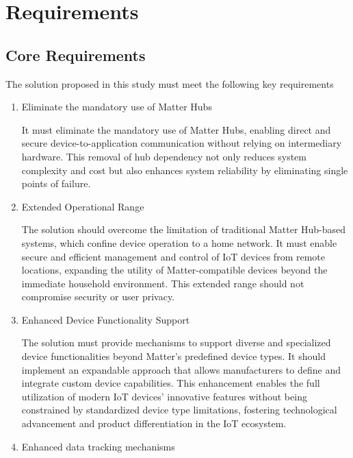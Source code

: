 \documentclass[conference]{IEEEtran}
\begin{document}
\section{Requirements}

\subsection{Core Requirements}
The solution proposed in this study must meet the following key requirements

\begin{enumerate}[itemsep=2ex, parsep=1ex]
	\item Eliminate the mandatory use of Matter Hubs
	      	      
	      It must eliminate the mandatory use of Matter Hubs, enabling direct and secure
	      device-to-application communication without relying on intermediary hardware.
	      This removal of hub dependency not only reduces system complexity and cost
	      but also enhances system reliability by eliminating single points of
	      failure.
	      	      
	\item Extended Operational Range
	      	      
	      The solution should overcome the limitation of traditional Matter Hub-based
	      systems, which confine device operation to a home network. It must enable
	      secure and efficient management and control of IoT devices from remote
	      locations, expanding the utility of Matter-compatible devices beyond the immediate
	      household environment. This extended range should not compromise security
	      or user privacy.
	      	      
	\item Enhanced Device Functionality Support
	      	                  
	      The solution must provide mechanisms to support diverse and specialized device functionalities beyond Matter's predefined device types. It should implement an expandable approach that allows manufacturers to define and integrate custom device capabilities. This enhancement enables the full utilization of modern IoT devices' innovative features without being constrained by standardized device type limitations, fostering technological advancement and product differentiation in the IoT ecosystem.
	      	      
	\item Enhanced data tracking mechanisms
	      	      

\end{enumerate}
\end{document}
